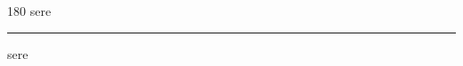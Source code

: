 
\begin{frame}
\begin{center}
\begin{turn}{180}
{\fontsize{2.5cm}{1em}\selectfont sere}
\end{turn}
\vspace{1em}\par  
\hrule
\vspace{1em}\par  
{\fontsize{2.5cm}{1em}\selectfont sere}
\end{center}
\end{frame}
